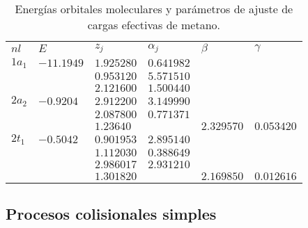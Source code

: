 \begin{table}[t]
\centering
\begin{tabular}{
>{\centering\arraybackslash}p{}
>{\centering\arraybackslash}p{}
>{\centering\arraybackslash}p{}
>{\centering\arraybackslash}p{}
>{\centering\arraybackslash}p{}
>{\centering\arraybackslash}p{}}
\rowcolor{mydarkgray} 
   $nl$ & $E$        & $z_j$        & $\alpha_j$   & $\beta$&$\gamma$\\
$1a_1$  & $-11.1949$ & $1.925280$ & $0.641982$ & & \\
\rowcolor{mygray} 
        &            & $0.953120$ & $5.571510$ & & \\
        &            & $2.121600$ & $1.500440$ & & \\
\rowcolor{mygray} 
$2a_2$  & $-0.9204$  & $2.912200$ & $3.149990$ & & \\
        &            & $2.087800$ & $0.771371$ & & \\
\rowcolor{mygray} 
        &            & $1.23640$  &            & $2.329570$&$0.053420$\\
$2t_1$  & $-0.5042$  & $0.901953$ & $2.895140$ & & \\
\rowcolor{mygray} 
        &            & $1.112030$ & $0.388649$ & & \\
        &            & $2.986017$ & $2.931210$ & & \\
\rowcolor{mygray} 
        &            & $1.301820$ &            & $2.169850$&$0.012616$\\ 
\end{tabular}
\caption[Energías y parámetros de ajuste de cargas efectivas de metano.]
{Energías orbitales moleculares y parámetros de ajuste de cargas 
efectivas de metano.}
\label{tab:ch4parameters}
\end{table}

\subsection{Procesos colisionales simples}
\label{subsec:procol}

